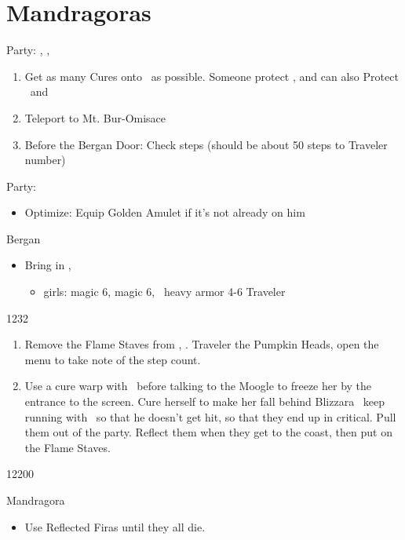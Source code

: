 \chapter{Mandragoras}
\begin{menu}
Party: \basch, \balthier, \fran
\end{menu}
\begin{enumerate}
	\item Get as many Cures onto \basch\ as possible. Someone protect \basch, and can also Protect \fran\ and \balthier
	\item Teleport to Mt. Bur-Omisace
	\item Before the Bergan Door: Check steps (should be about 50 steps to Traveler number)
\end{enumerate}
\begin{menu}
Party: \vaan
\end{menu}
\begin{equip}
\begin{itemize}
\item Optimize: \vaan
\vaanf Equip Golden Amulet if it's not already on him
\end{itemize}
\end{equip}
\begin{battle}{Bergan}
	\begin{itemize}
		\vaanf Run up to Bergan
		\item Bring in \ashe, \penelo
		      \begin{liscense}
			      \begin{itemize}
				      \item girls: magic 6, magic 6, \vaan\ heavy armor 4-6
				            \vaanf Traveler
			      \end{itemize}
		      \end{liscense}
	\end{itemize}
\end{battle}
\begin{shop}{1232}
\end{shop}
\begin{enumerate}
	\item Remove the Flame Staves from \ashe, \penelo.
	      \vaanf Traveler the Pumpkin Heads, open the menu to take note of the step count.
	\item Use a cure warp with \ashe\ before talking to the Moogle to freeze her by the entrance to the screen.
	      \ashef Cure herself to make her fall behind
	      \penelof Blizzara \ashe\, keep running with \vaan\ so that he doesn't get hit, so that they end up in critical. Pull them out of the party. Reflect them when they get to the coast, then put on the Flame Staves.
\end{enumerate}
\begin{shop}{12200}
\end{shop}
\begin{battle}{Mandragora}
	\begin{itemize}
		\vaanf Wait for them to gather up, then Traveler them.
		\item Use Reflected Firas until they all die.
	\end{itemize}
\end{battle}